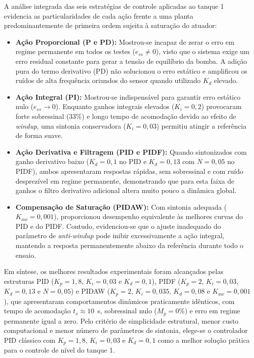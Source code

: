 \documentclass[a4paper,12pt]{article}
\begin{document}
\begin{justify}
    \hspace{4ex}A análise integrada das seis estratégias de controle aplicadas ao tanque 1 evidencia as particularidades de cada ação frente a uma planta predominantemente de primeira ordem sujeita à saturação do atuador:
\end{justify}

\begin{itemize}
    \item \textbf{Ação Proporcional (P e PD):} Mostrou-se incapaz de zerar o erro em regime permanente em todos os testes ($e_{ss} \neq 0$), visto que o sistema exige um erro residual constante para gerar a tensão de equilíbrio da bomba. A adição pura do termo derivativo (PD) não solucionou o erro estático e amplificou os ruídos de alta frequência oriundos do sensor quando utilizado $K_d$ elevado.
    \item \textbf{Ação Integral (PI):} Mostrou-se indispensável para garantir erro estático nulo ($e_{ss} \to 0$). Enquanto ganhos integrais elevados ($K_i = 0{,}2$) provocaram forte sobressinal ($33\%$) e longo tempo de acomodação devido ao efeito de \textit{windup}, uma sintonia conservadora ($K_i = 0{,}03$) permitiu atingir a referência de forma suave.
    \item \textbf{Ação Derivativa e Filtragem (PID e PIDF):} Quando sintonizados com ganho derivativo baixo ($K_d = 0{,}1$ no PID e $K_d = 0{,}13$ com $N = 0{,}05$ no PIDF), ambos apresentaram respostas rápidas, sem sobressinal e com ruído desprezível em regime permanente, demonstrando que para esta faixa de ganhos o filtro derivativo adicional altera muito pouco a dinâmica global.
    \item \textbf{Compensação de Saturação (PIDAW):} Com sintonia adequada ($K_{aw} = 0{,}001$), proporcionou desempenho equivalente às melhores curvas do PID e do PIDF. Contudo, evidenciou-se que o ajuste inadequado do parâmetro de \textit{anti-windup} pode inibir excessivamente a ação integral, mantendo a resposta permanentemente abaixo da referência durante todo o ensaio.
\end{itemize}

\begin{justify}
    \hspace{4ex}Em síntese, os melhores resultados experimentais foram alcançados pelas estruturas PID ($K_p = 1{,}8$, $K_i = 0{,}03$ e $K_d = 0{,}1$), PIDF ($K_p = 2$, $K_i = 0{,}03$, $K_d = 0{,}13$ e $N = 0{,}05$) e PIDAW ($K_p = 2$, $K_i = 0{,}035$, $K_d = 0{,}08$ e $K_{aw} = 0{,}001$), que apresentaram comportamentos dinâmicos praticamente idênticos, com tempo de acomodação $t_s \approx 10$~s, sobressinal nulo ($M_p = 0\%$) e erro em regime permanente igual a zero. Pelo critério de simplicidade estrutural, menor custo computacional e menor número de parâmetros de sintonia, elege-se o controlador PID clássico com $K_p = 1{,}8$, $K_i = 0{,}03$ e $K_d = 0{,}1$ como a melhor solução prática para o controle de nível do tanque 1.
\end{justify}
\end{document}
